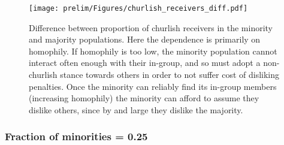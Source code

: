 \documentclass[11pt,letterpaper]{article}
\begin{document}
\begin{figure}[H]
  \centering
    \texttt{[image: prelim/Figures/churlish\_receivers\_diff.pdf]}
  \caption{Difference between proportion of churlish receivers in the minority 
    and majority populations. Here the dependence is primarily on homophily.
    If homophily is too low, the minority population cannot interact often
    enough with their in-group, and so must adopt a non-churlish stance towards
    others in order to not suffer cost of disliking penalties. Once the minority
    can reliably find its in-group members (increasing homophily) the minority
    can afford to assume they dislike others, since by and large they dislike
    the majority.
  }
  \label{fig:}
\end{figure}


\subsubsection{Fraction of minorities = 0.25}
\end{document}
